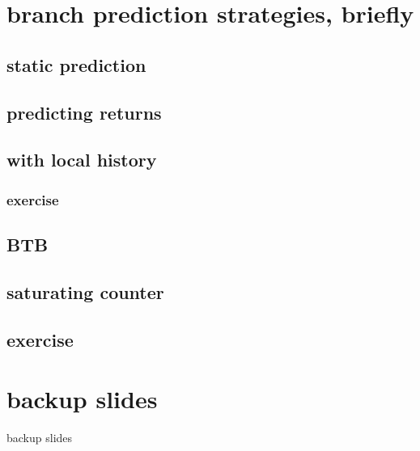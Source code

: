 

\section{branch prediction strategies, briefly}

\subsection{static prediction}


\subsection{predicting returns}


\subsection{with local history}


\subsubsection{exercise}


\subsection{BTB}


\subsection{saturating counter}


\subsection{exercise}



\section{backup slides}
\begin{frame}{backup slides}
\end{frame}
